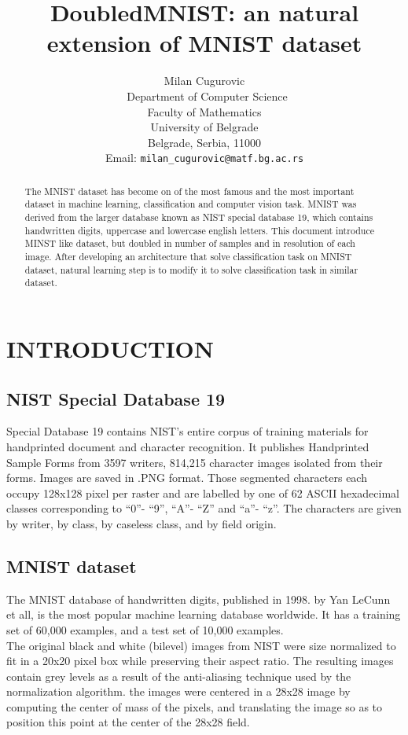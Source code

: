 \documentclass[letterpaper, 10 pt, conference]{ieeeconf}
\title{\LARGE \bf
DoubledMNIST: an natural extension of MNIST dataset
}
\author{Milan Cugurovic \\\
	Department of Computer Science \\
 	Faculty of Mathematics \\
	University of Belgrade \\
	Belgrade, Serbia, 11000 \\
	Email: {\tt\small milan\_cugurovic@matf.bg.ac.rs}
}
\begin{document}
\maketitle
\thispagestyle{empty}
\pagestyle{empty}

\begin{abstract}

The MNIST dataset has become on of the most famous and the most important dataset in machine learning, classification and computer vision task. MNIST was derived from the larger database known as NIST special database 19, which contains handwritten digits, uppercase and lowercase english letters. This document introduce MINST like dataset, but doubled in number of samples and in resolution of each image. After developing an architecture that solve classification task on MNIST dataset, natural learning step is to modify it to solve classification task in similar dataset.

\end{abstract}

\section{INTRODUCTION}

\subsection{NIST Special Database 19}
Special Database 19 contains NIST's entire corpus of training materials for handprinted document and character recognition. It publishes Handprinted Sample Forms from 3597 writers, 814,215 character images isolated from their forms. Images are saved in .PNG format. Those segmented characters each occupy 128x128 pixel per raster and are labelled by one of 62 ASCII hexadecimal classes corresponding to “0”- “9”, “A”- “Z” and “a”- “z”. The characters are given by writer, by class, by caseless class, and by field origin.

\subsection{MNIST dataset}
The MNIST database of handwritten digits, published in 1998. by Yan LeCunn et all, is the most popular machine learning database worldwide. It has a training set of 60,000 examples, and a test set of 10,000 examples. \\
The original black and white (bilevel) images from NIST were size normalized to fit in a 20x20 pixel box while preserving their aspect ratio. The resulting images contain grey levels as a result of the anti-aliasing technique used by the normalization algorithm. the images were centered in a 28x28 image by computing the center of mass of the pixels, and translating the image so as to position this point at the center of the 28x28 field.
\end{document}

